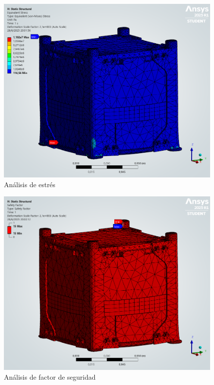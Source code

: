   \begin{figure}[H]
    \centering
    \includegraphics[width=14cm]{image/fem/ansys_cubesat-static_stress.png}
    \caption{Análisis de estrés}
    \label{fig:fem_static_stress}
  \end{figure}

  \begin{figure}[H]
    \centering
    \includegraphics[width=14cm]{image/fem/ansys_cubesat-static_safety.png}
    \caption{Análisis de factor de seguridad}
    \label{fig:fem_static_safety}
  \end{figure}

